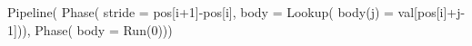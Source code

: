 \begin{juliacode}
Pipeline(
  Phase(
    stride = pos[i+1]-pos[i],
    body = Lookup(
      body(j) = val[pos[i]+j-1])),
  Phase(
    body = Run(0)))
\end{juliacode}
